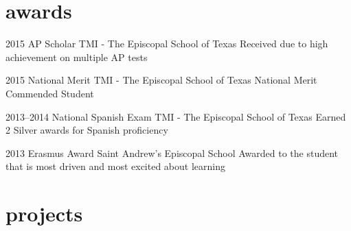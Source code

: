 \documentclass[]{friggeri-cv} %
\begin{document}
\section{awards}

\begin{entrylist}

	\entry
	{2015}
	{AP Scholar}
	{TMI - The Episcopal School of Texas}
	{Received due to high achievement on multiple AP tests}


	\entry
	{2015}
	{National Merit}
	{TMI - The Episcopal School of Texas}
	{National Merit Commended Student}


	\entry
	{2013--2014}
	{National Spanish Exam}
	{TMI - The Episcopal School of Texas}
	{Earned 2 Silver awards for Spanish proficiency}


	\entry
	{2013}
	{Erasmus Award}
	{Saint Andrew's Episcopal School}
	{Awarded to the student that is most driven and most excited about learning}

\end{entrylist}


\section{projects}
\end{document}
